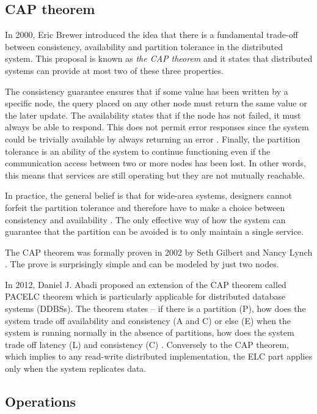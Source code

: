 \documentclass[oneside,
  digital, %
  table,   %
  lof,     %
  lot,     %
]{fithesis3}
\begin{document}
\subsection{CAP theorem}
\label{sec:cap-theorem}

In 2000, Eric Brewer introduced the idea that there is a fundamental trade-off between consistency, availability and partition tolerance \cite{persp_cap} in the distributed system. This proposal is known as \textit{the CAP theorem} and it states that distributed systems can provide at most two of these three properties.

The consistency guarantee ensures that if some value has been written by a specific node, the query placed on any other node must return the same value or the later update. The availability states that if the node has not failed, it must always be able to respond. This does not permit error responses since the system could be trivially available by always returning an error \cite{cap_faq}. Finally, the partition tolerance is an ability of the system to continue functioning even if the communication access between two or more nodes has been lost. In other words, this means that services are still operating but they are not mutually reachable.

In practice, the general belief is that for wide-area systems, designers cannot forfeit the partition tolerance and therefore have to make a choice between consistency and availability \cite{cap_12years}. The only effective way of how the system can guarantee that the partition can be avoided is to only maintain a single service.

The CAP theorem was formally proven in 2002 by Seth Gilbert and Nancy Lynch \cite{cap_prove}. The prove is surprisingly simple and can be modeled by just two nodes.

In 2012, Daniel J. Abadi proposed an extension of the CAP theorem called PACELC theorem which is particularly applicable for distributed database systems (DDBSs). The theorem states -- if there is a partition (P), how does the system trade off availability and consistency (A and C) or else (E) when the system is running normally in the absence of partitions, how does the system trade off latency (L) and consistency (C) \cite{pacelc}. Conversely to the CAP theorem, which implies to any read-write distributed implementation, the ELC part applies only when the system replicates data.

\subsection{Operations}
\end{document}
